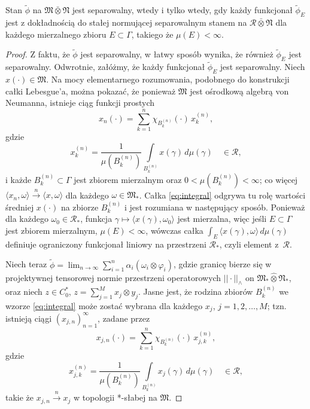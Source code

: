 \begin{Lemma}
Stan $\tilde{\phi}$ na $\mathfrak{M} \bar{\otimes} \mathfrak{N}$
jest separowalny, wtedy i tylko wtedy, gdy każdy funkcjonał $\tilde{\phi}_{E}$
jest z dokładnością do stałej normującej separowalnym stanem na
$\mathcal{R} \bar{\otimes} \mathfrak{N}$
dla każdego mierzalnego zbioru $E \subset \Gamma$,
takiego że $\mu(E) < \infty$.
\end{Lemma}
\begin{proof}
Z faktu, że $\tilde{\phi}$ jest separowalny, w łatwy sposób wynika, że również
$\tilde{\phi}_{E}$ jest separowalny.
Odwrotnie, załóżmy, że każdy funkcjonał $\tilde{\phi}_{E}$ jest separowalny.
Niech $x(\cdot) \in \mathfrak{M}$.
Na mocy elementarnego rozumowania,
podobnego do konstrukcji całki Lebesgue'a,
można pokazać, że ponieważ $\mathfrak{M}$ jest ośrodkową algebrą von Neumanna,
istnieje ciąg funkcji prostych
\begin{equation}
x_{n}(\cdot) =     \sum \limits_{k=1}^{n} \chi_{B_{k}^{(n)}}(\cdot)\, x_{k}^{(n)},
\end{equation}
gdzie
\begin{equation}
\label{eq:integral}
x_{k}^{(n)} = \frac{1}{\mu(B_{k}^{(n)})}
\int \limits_{B_{k}^{(n)}} x(\gamma) \, d\mu(\gamma)\quad \in \mathcal{R},
\end{equation}
i każde $B_{k}^{(n)} \subset \Gamma$ jest zbiorem mierzalnym oraz
$0< \mu(B_{k}^{(n)}) < \infty$;
co więcej $\langle x_{n}, \omega \rangle\stackrel{n}{\rightarrow}\langle x,
\omega \rangle$ dla każdego $\omega \in \mathfrak{M}_{*}$.
Całka \eqref{eq:integral} odgrywa tu rolę wartości średniej $x(\cdot)$
na zbiorze $B_{k}^{(n)}$ i jest rozumiana w następujący sposób.
Ponieważ dla każdego $\omega_{0} \in \mathcal{R}_{*}$,
funkcja $\gamma \mapsto \langle x(\gamma), \omega_{0} \rangle$
jest mierzalna, więc jeśli $E \subset \Gamma$ jest zbiorem mierzalnym,
$\mu(E) < \infty$,
wówczas całka $\int_{E} \langle x(\gamma), \omega \rangle \, d \mu(\gamma)$
definiuje ograniczony funkcjonał liniowy na przestrzeni $\mathcal{R}_{*}$,
czyli element \mbox{z $\mathcal{R}$}.

Niech teraz $\tilde{\phi} =\lim_{n\to\infty}\sum_{i=1}^{n}\alpha_i(\omega_{i}\otimes\varphi_{i})$,
gdzie granicę bierze się w projektywnej tensorowej normie przestrzeni operatorowych
$|| \cdot ||_{\wedge}$ on $\mathfrak{M}_{*} \hat{\otimes} \mathfrak{N}_{*}$,
oraz niech $z \in C_{0}^{*}$, $z = \sum_{j=1}^{M} x_{j} \otimes y_{j}$.
Jasne jest, że rodzina zbiorów $B_{k}^{(n)}$ we wzorze \eqref{eq:integral}
może zostać wybrana dla każdego $x_{j}$, $j = 1,2, \ldots, M$; tzn.
istnieją ciągi $(x_{j,n})_{n=1}^{\infty}$, zadane przez
\begin{equation}
x_{j,n}(\cdot) =     \sum \limits_{k=1}^{n} \chi_{B_{k}^{(n)}}(\cdot)
\, x_{j,k}^{(n)},
\end{equation}
gdzie
\begin{equation}
\label{eq:integralxes}
x_{j,k}^{(n)} = \frac{1}{\mu(B_{k}^{(n)})}
\int \limits_{B_{k}^{(n)}} x_{j}(\gamma) \, d\mu(\gamma)
\quad \in \mathcal{R},
\end{equation}
takie że $x_{j,n} \stackrel{n}{\longrightarrow} x_{j}$
w topologii *-słabej na  $\mathfrak{M}$.


\end{proof}
